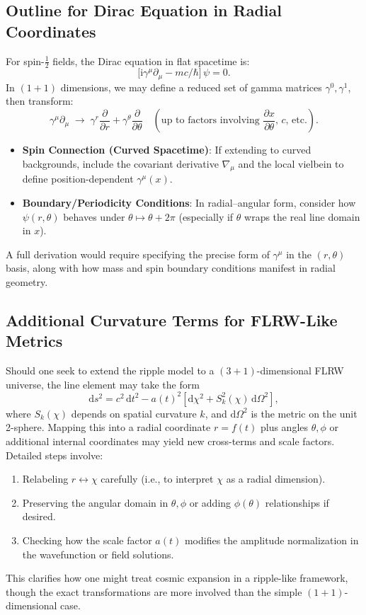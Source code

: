 \documentclass{article}
\begin{document}
\subsection{Outline for Dirac Equation in Radial Coordinates}
\label{app:sec:dirac-derivation}
For spin-$\tfrac12$ fields, the Dirac equation in flat spacetime is:
\[
  \bigl[\mathrm{i}\gamma^\mu \partial_\mu - m c/\hbar\bigr]\,\psi = 0.
\]
In $(1+1)$ dimensions, we may define a reduced set of gamma matrices 
$\gamma^0,\gamma^1$, then transform:
\[
  \gamma^\mu \partial_\mu \;\to\; 
  \gamma^r \frac{\partial}{\partial r} + \gamma^\theta \frac{\partial}{\partial \theta}
  \quad(\text{up to factors involving } \frac{\partial x}{\partial \theta},\,c,\,\text{etc.}).
\]
\begin{itemize}
  \item \textbf{Spin Connection (Curved Spacetime)}: If extending to curved backgrounds, 
        include the covariant derivative $\nabla_\mu$ and the local vielbein 
        to define position-dependent $\gamma^\mu(x)$.
  \item \textbf{Boundary/Periodicity Conditions}: In radial--angular form, consider 
        how $\psi(r,\theta)$ behaves under $\theta \mapsto \theta + 2\pi$ 
        (especially if $\theta$ wraps the real line domain in $x$).
\end{itemize}
A full derivation would require specifying the precise form of $\gamma^\mu$ in 
the $(r,\theta)$ basis, along with how mass and spin boundary conditions 
manifest in radial geometry.

\subsection{Additional Curvature Terms for FLRW-Like Metrics}
\label{app:sec:FLRW-derivation}
Should one seek to extend the ripple model to a $(3+1)$-dimensional FLRW 
universe, the line element may take the form
\[
  \mathrm{d}s^2 = c^2\,\mathrm{d}t^2 - a(t)^2 
  \left[\mathrm{d}\chi^2 + S_k^2(\chi)\,\mathrm{d}\Omega^2\right],
\]
where $S_k(\chi)$ depends on spatial curvature $k$, and $\mathrm{d}\Omega^2$ 
is the metric on the unit 2-sphere. Mapping this into a radial coordinate 
$r = f(t)$ plus angles $\theta,\phi$ or additional internal coordinates 
may yield new cross-terms and scale factors. Detailed steps involve:
\begin{enumerate}
  \item Relabeling $r \leftrightarrow \chi$ carefully (i.e., to interpret 
        $\chi$ as a radial dimension).
  \item Preserving the angular domain in $\theta,\phi$ or adding 
        $\phi(\theta)$ relationships if desired.
  \item Checking how the scale factor $a(t)$ modifies the amplitude normalization 
        in the wavefunction or field solutions.
\end{enumerate}
This clarifies how one might treat cosmic expansion in a ripple-like 
framework, though the exact transformations are more involved than 
the simple $(1+1)$-dimensional case.
\end{document}
